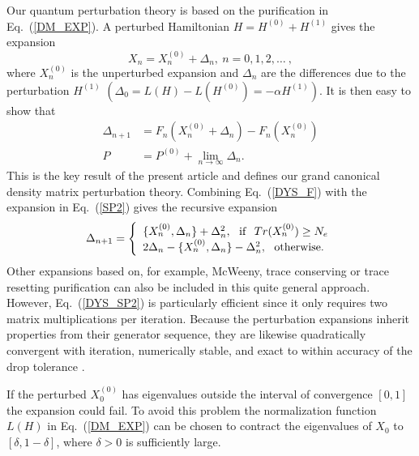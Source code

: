 Our quantum perturbation theory is based on 
the purification in Eq.\ (\ref{DM_EXP}).
A perturbed Hamiltonian $H = H^{(0)} + H^{(1)}$ gives
the expansion 
\begin{equation}\label{dX}
{X_n} = X_n^{(0)} + \Delta_n, ~ n = 0,1,2,\ldots~,
\end{equation}
where $X_n^{(0)}$ is the unperturbed expansion 
and $\Delta_n$ are the differences due to the perturbation $H^{(1)}$
$(\Delta_0 = L(H)-L(H^{(0)}) = -\alpha H^{(1)})$.  It is then easy to 
show that \begin{equation}\label{DYS_F}\begin{array}{ll}
\Delta_{n+1} &= F_n(X_n^{(0)} + \Delta_n) - F_n(X_n^{(0)})\\
{P} &= P^{(0)} + \lim_{n \rightarrow \infty} \Delta_n. \end{array}
\end{equation}
This is the key result of the present
article and defines our grand canonical density matrix perturbation theory.
Combining Eq.\ (\ref{DYS_F}) with the expansion in Eq.\ (\ref{SP2}) gives 
the recursive expansion \cite{Notation}
\begin{equation} \label{DYS_SP2}
\Delta_{n+1} = 
\left\{\begin{array}{l}
\{ X_n^{(0)},\Delta_n\} + \Delta_n^2, ~~{\rm if} ~~  Tr(X_n^{(0)}) \geq N_e \\
2\Delta_n - \{ X_n^{(0)},\Delta_n\} - \Delta_n^2, ~~ {\rm otherwise}.
\end{array} \right.
\end{equation}
Other expansions based on, for example, McWeeny, trace conserving or 
trace resetting purification \cite{McWeeny60,Palser98,NiklassonSP4}
can also be included in this quite general approach. However, 
Eq.\ (\ref{DYS_SP2}) is particularly efficient since it only 
requires two matrix multiplications per iteration.
Because the perturbation expansions inherit properties from their 
generator sequence, they are likewise quadratically convergent with 
iteration, numerically stable, and exact to within accuracy 
of the drop tolerance \cite{NiklassonSP4}.

If the perturbed ${X}_0^{(0)}$ has eigenvalues outside the interval 
of convergence $[0,1]$ the expansion could fail. To avoid this problem 
the normalization function $L(H)$ in Eq.\ (\ref{DM_EXP}) can be chosen to contract the
eigenvalues of $X_0$ to $[\delta,1-\delta]$, where $\delta>0$ is sufficiently large.

